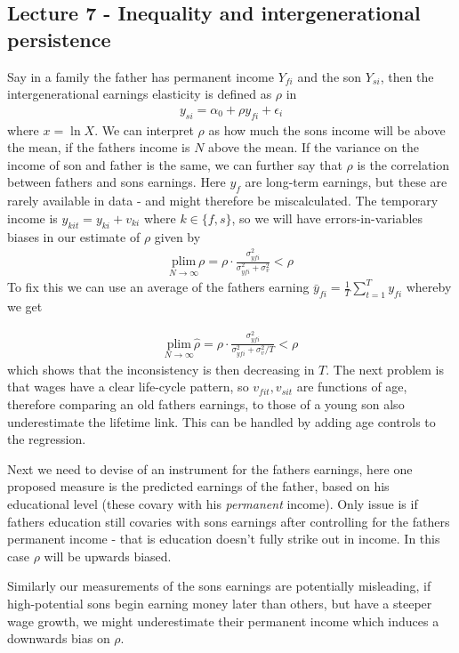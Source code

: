\documentclass[12pt, a4paper]{article}
\begin{document}
\begin{multicols}{2}
\subsection{Lecture 7 - Inequality and intergenerational persistence}
Say in a family the father has permanent income $Y_{fi}$ and the son $Y_{si}$, then the intergenerational earnings elasticity is defined as $\rho$ in
\begin{align*}
y_{si} = \alpha_0 + \rho y_{fi} + \epsilon_i
\end{align*}
where $x = \ln X$. We can interpret $\rho$ as how much the sons income will be above the mean, if the fathers income is $N$ above the mean. If the variance on the income of son and father is the same, we can further say that $\rho$ is the correlation between fathers and sons earnings. Here $y_f$ are long-term earnings, but these are rarely available in data - and might therefore be miscalculated. The temporary income is $y_{kit}=y_{ki}+ v_{ki}$ where $k\in\{f,s\}$, so we will have errors-in-variables biases in our estimate of $\rho$ given by
\begin{align*}
\underset{N \rightarrow \infty}{\text{plim}} \rho = \rho \cdot \frac{\sigma^2_{yfi}}{\sigma^2_{yfi}+ \sigma^2_v}<\rho
\end{align*}
To fix this we can use an average of the fathers earning $\bar{y}_{fi} = \frac{1}{T}\sum_{t=1}^T y_{fi}$ whereby we get

\begin{align*}
\underset{N \rightarrow \infty}{\text{plim}} \hat{\rho} = \rho \cdot \frac{\sigma^2_{yfi}}{\sigma^2_{yfi}+ \sigma^2_v/T}<\rho
\end{align*}
which shows that the inconsistency is then decreasing in $T$. The next problem is that wages have a clear life-cycle pattern, so $v_{fit}, v_{sit}$ are functions of age, therefore comparing an old fathers earnings, to those of a young son also underestimate the lifetime link. This can be handled by adding age controls to the regression.  

Next we need to devise of an instrument for the fathers earnings, here one proposed measure is the predicted earnings of the father, based on his educational level (these covary with his \textit{permanent} income). Only issue is if fathers education still covaries with sons earnings after controlling for the fathers permanent income - that is education doesn't fully strike out in income. In this case $\rho$ will be upwards biased. 

Similarly our measurements of the sons earnings are potentially misleading, if high-potential sons begin earning money later than others, but have a steeper wage growth, we might underestimate their permanent income which induces a downwards bias on $\rho$.


\end{multicols}
\end{document}
